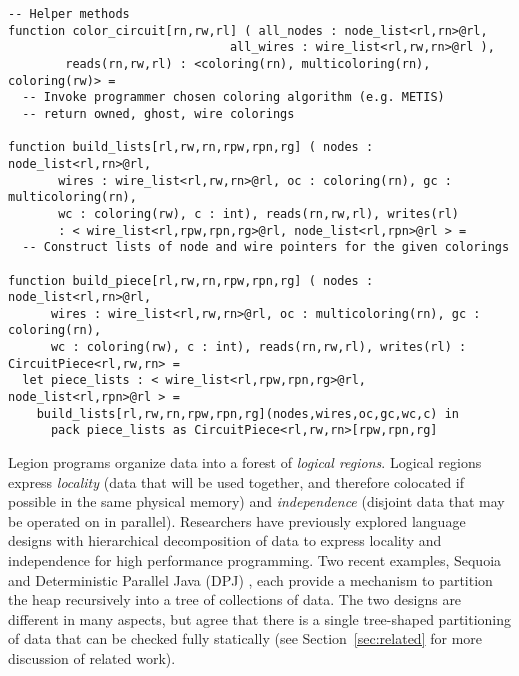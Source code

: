 \begin{lstlisting}[float={t},label={lst:circuit_ex},caption={Circuilt Simulation}]
-- Helper methods
function color_circuit[rn,rw,rl] ( all_nodes : node_list<rl,rn>@rl, 
                               all_wires : wire_list<rl,rw,rn>@rl ), 
        reads(rn,rw,rl) : <coloring(rn), multicoloring(rn), coloring(rw)> =  
  -- Invoke programmer chosen coloring algorithm (e.g. METIS)
  -- return owned, ghost, wire colorings

function build_lists[rl,rw,rn,rpw,rpn,rg] ( nodes : node_list<rl,rn>@rl, 
       wires : wire_list<rl,rw,rn>@rl, oc : coloring(rn), gc : multicoloring(rn), 
       wc : coloring(rw), c : int), reads(rn,rw,rl), writes(rl) 
       : < wire_list<rl,rpw,rpn,rg>@rl, node_list<rl,rpn>@rl > = 
  -- Construct lists of node and wire pointers for the given colorings

function build_piece[rl,rw,rn,rpw,rpn,rg] ( nodes : node_list<rl,rn>@rl, 
      wires : wire_list<rl,rw,rn>@rl, oc : multicoloring(rn), gc : coloring(rn), 
      wc : coloring(rw), c : int), reads(rn,rw,rl), writes(rl) : CircuitPiece<rl,rw,rn> =
  let piece_lists : < wire_list<rl,rpw,rpn,rg>@rl, node_list<rl,rpn>@rl > = 
    build_lists[rl,rw,rn,rpw,rpn,rg](nodes,wires,oc,gc,wc,c) in
      pack piece_lists as CircuitPiece<rl,rw,rn>[rpw,rpn,rg] 
\end{lstlisting}

Legion programs organize data into a forest of {\em logical regions}.  Logical
regions express {\em locality} (data that will be used together, and therefore colocated if possible in the same
physical memory) and {\em independence} (disjoint data that may be operated on in parallel).
Researchers have previously explored language designs with hierarchical decomposition of data to express
locality and independence for high performance programming. Two recent examples, Sequoia \cite{Fatahalion06} and 
Deterministic Parallel Java (DPJ) \cite{Bocchino09}, each provide a mechanism to partition the heap recursively
into a tree of collections of data.  The two designs are different in many aspects, but agree that there is
a single tree-shaped partitioning of data that can be checked fully statically (see Section~\ref{sec:related} for more
discussion of related work).

